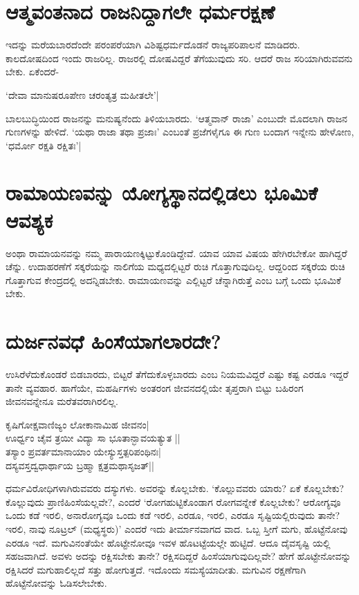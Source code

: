 \section*{ಆತ್ಮವಂತನಾದ ರಾಜನಿದ್ದಾಗಲೇ ಧರ್ಮರಕ್ಷಣೆ}

ಇದನ್ನು ಮರೆಯಬಾರದೆಂದೇ ಪರಂಪರೆಯಾಗಿ ವಿಶಿಷ್ಟಧರ್ಮದೊಡನೆ ರಾಜ್ಯಪರಿಪಾಲನೆ ಮಾಡಿದರು. ಕಾಲದೋಷದಿಂದ ಇಂದು ರಾಜರಿಲ್ಲ. ರಾಜರಲ್ಲಿ ದೋಷವಿದ್ದರೆ ತೆಗೆಯುವುದು ಸರಿ. ಆದರೆ ರಾಜ ಸರಿಯಾಗಿರುವವನು ಬೇಕು. ಏಕೆಂದರೆ-

\begin{shloka}
`ದೇವಾ ಮಾನುಷರೂಪೇಣ ಚರಂತ್ಯತ್ರ ಮಹೀತಲೇ'|\label{225}
\end{shloka}

ಬಾಲಬುದ್ಧಿಯಿಂದ ರಾಜನನ್ನು ಮನುಷ್ಯನೆಂದು ತಿಳಿಯಬಾರದು. `ಆತ್ಮವಾನ್ ರಾಜಾ' ಎಂಬುದೇ ಮೊದಲಾಗಿ ರಾಜನ ಗುಣಗಳನ್ನು ಹೇಳಿದೆ. `ಯಥಾ ರಾಜಾ ತಥಾ ಪ್ರಜಾಃ' ಎಂಬಂತೆ ಪ್ರಜೆಗಳೈಗೂ ಈ ಗುಣ ಬಂದಾಗ ಇನ್ನೇನು ಹೇಳೋಣ, `ಧರ್ಮೋ ರಕ್ಷತಿ ರಕ್ಷಿತಃ'|\label{225}

\section*{ರಾಮಾಯಣವನ್ನು ಯೋಗ್ಯಸ್ಥಾನದಲ್ಲಿಡಲು ಭೂಮಿಕೆ ಆವಶ್ಯಕ}

ಅಂಥಾ ರಾಮಾಯನವನ್ನು ನಮ್ಮ ಪಾರಾಯಣಕ್ಕಿಟ್ಟುಕೊಂಡಿದ್ದೇವೆ. ಯಾವ ಯಾವ ವಿಷಯ ಹೇಗಿರಬೇಕೋ ಹಾಗಿದ್ದರೆ ಚೆನ್ನು. ಉದಾಹರಣೆಗೆ ಸಕ್ಕರೆಯನ್ನು ನಾಲಿಗೆಯ ಮಧ್ಯದಲ್ಲಿಟ್ಟರೆ ರುಚಿ ಗೊತ್ತಾಗುವುದಿಲ್ಲ. ಆದ್ದರಿಂದ ಸಕ್ಕರೆಯ ರುಚಿ ಗೊತ್ತಾಗುವ ಕೇಂದ್ರದಲ್ಲಿ ಅದನ್ನಿಡಬೇಕು. ರಾಮಾಯಣವನ್ನು ಎಲ್ಲಿಟ್ಟರೆ ಚೆನ್ನಾಗಿರುತ್ತೆ ಎಂಬ ಬಗ್ಗೆ ಒಂದು ಭೂಮಿಕೆ ಬೇಕು.

\section*{ದುರ್ಜನವಧೆ ಹಿಂಸೆಯಾಗಲಾರದೇ?}

ಉಸಿರೆಳೆದುಕೊಂಡರೆ ಬಿಡಬಾರದು, ಬಿಟ್ಟರೆ ತೆಗೆದುಕೊಳ್ಳಬಾರದು ಎಂಬ ನಿಯಮವಿದ್ದರೆ ಎಷ್ಟು ಕಷ್ಟ ಎರಡೂ ಇದ್ದರೆ ತಾನೇ ವ್ಯವಹಾರ. ಹಾಗೆಯೇ, ಮಹರ್ಷಿಗಳು ಅಂತರಂಗ ಜೀವನದಲ್ಲಿಯೇ ತೃಪ್ತರಾಗಿ ಬಿಟ್ಟು ಬಹಿರಂಗ ಜೀವನವನ್ನೇನೂ ಮರೆತವರಾಗಿರಲಿಲ್ಲ.

\begin{shloka}
ಕೃಷಿಗೋಕ್ಷವಾಣಿಜ್ಯಂ ಲೋಕಾನಾಮಿಹ ಜೀವನಂ|\label{225}\\
ಊರ್ಧ್ವಂ ಚೈವ ತ್ರಯೀ ವಿದ್ಯಾ ಸಾ‌ ಭೂತಾನ್ಭಾವಯತ್ಯುತ ||\\
ತಸ್ಯಾಂ ಪ್ರವರ್ತಮಾನಾಯಾಂ ಯೇಸ್ಯುಸ್ತತ್ಪರಿಪಂಥಿನಃ|\\
ದಸ್ಯವಸ್ತದ್ವಧಾರ್ಥಾಯ ಬ್ರಹ್ಮಾ ಕ್ಷತ್ರಮಥಾಸೃಜತ್||
\end{shloka}
ಧರ್ಮವಿರೋಧಿಗಳಾಗಿರುವವರು ದಸ್ಯುಗಳು. ಅವರನ್ನು ಕೊಲ್ಲಬೇಕು. `ಕೊಲ್ಲುವವರು ಯಾರು? ಏಕೆ ಕೊಲ್ಲಬೇಕು? ಕೊಲ್ಲುವುದು ಪ್ರಾಣಿಹಿಂಸೆಯಲ್ಲವೇ?, ಎಂದರೆ `ರೋಗಹುಟ್ಟಿಕೊಂಡಾಗ ರೋಗವನ್ನೇಕೆ ಕೊಲ್ಲಬೇಕು? ಆರೋಗ್ಯವೂ ಒಂದು ಕಡೆ ಇರಲಿ, ಅನಾರೋಗ್ಯವೂ ಒಂದು ಕಡೆ ಇರಲಿ, ಎರಡೂ, ಇರಲಿ, ಎರಡೂ ಸೃಷ್ಟಿಯಲ್ಲಿರುವುದು ತಾನೇ? ಇರಲಿ, ನಾವು ನೂಟ್ರಲ್ (ಮಧ್ಯಸ್ಥರು)' ಎಂದರೆ ಇದು ತೀರ್ಮಾನವಾಗದ ವಾದ. ಒಬ್ಬ ಸ್ತೀಗೆ ಮಗು, ಹೊಟ್ಟೆನೋವು ಎರಡೂ ಇದೆ. ಮಗುವಿನಂತೆಯೇ ಹೊಟ್ಟೇನೋವೂ ಇವಳ ಹೊಟಟ್ಟೆಯಲ್ಲೇ ಹುಟ್ಟಿದೆ. ಆದೂ ದೈವಸೃಷ್ಟಿ ಯಲ್ಲಿ ಸಹಜವಾಗಿದೆ. ಅವಳು ಅದನ್ನು ರಕ್ಷಿಸಬೇಕು ತಾನೇ? ರಕ್ಷಿಸದಿದ್ದರೆ ಹಿಂಸೆಯಾಗುವುದಿಲ್ಲವೇ? ಹೇಗೆ ಹೊಟ್ಟೇನೋವನ್ನು ರಕ್ಷಿಸಿದರೆ ಮಗುಹಾಲಿಲ್ಲದೆ ಸತ್ತು ಹೋಗುತ್ತದೆ. ಇದೊಂದು ಸಮಸ್ಯೆಯಾದೀತು. ಮಗುವಿನ ರಕ್ಷಣೆಗಾಗಿ ಹೊಟ್ಟೆನೋವನ್ನು ಓಡಿಸಲೇಬೇಕು.

